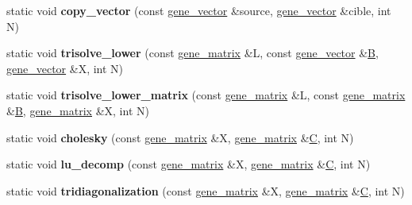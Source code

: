 \begin{DoxyCompactItemize}
static void {\bfseries copy\+\_\+vector} (const \hyperlink{group___core___module_class_eigen_1_1_matrix}{gene\+\_\+vector} \&source, \hyperlink{group___core___module_class_eigen_1_1_matrix}{gene\+\_\+vector} \&cible, int N)
\item 
\mbox{\label{classeigen2__interface_a54fa14604cc4b0b1e3242ade3169b3da}} 
static void {\bfseries trisolve\+\_\+lower} (const \hyperlink{group___core___module_class_eigen_1_1_matrix}{gene\+\_\+matrix} \&L, const \hyperlink{group___core___module_class_eigen_1_1_matrix}{gene\+\_\+vector} \&\hyperlink{group___core___module_class_eigen_1_1_matrix}{B}, \hyperlink{group___core___module_class_eigen_1_1_matrix}{gene\+\_\+vector} \&X, int N)
\item 
\mbox{\label{classeigen2__interface_ac52c06543bc30c0527a7f79c2c2b516e}} 
static void {\bfseries trisolve\+\_\+lower\+\_\+matrix} (const \hyperlink{group___core___module_class_eigen_1_1_matrix}{gene\+\_\+matrix} \&L, const \hyperlink{group___core___module_class_eigen_1_1_matrix}{gene\+\_\+matrix} \&\hyperlink{group___core___module_class_eigen_1_1_matrix}{B}, \hyperlink{group___core___module_class_eigen_1_1_matrix}{gene\+\_\+matrix} \&X, int N)
\item 
\mbox{\label{classeigen2__interface_a7aba0565565f8768bbba2bb596358056}} 
static void {\bfseries cholesky} (const \hyperlink{group___core___module_class_eigen_1_1_matrix}{gene\+\_\+matrix} \&X, \hyperlink{group___core___module_class_eigen_1_1_matrix}{gene\+\_\+matrix} \&\hyperlink{group___core___module}{C}, int N)
\item 
\mbox{\label{classeigen2__interface_a2496a534900ab7c5b1efec982222138e}} 
static void {\bfseries lu\+\_\+decomp} (const \hyperlink{group___core___module_class_eigen_1_1_matrix}{gene\+\_\+matrix} \&X, \hyperlink{group___core___module_class_eigen_1_1_matrix}{gene\+\_\+matrix} \&\hyperlink{group___core___module}{C}, int N)
\item 
\mbox{\label{classeigen2__interface_a4a147008360e79e0dd23c1c1cf735522}} 
static void {\bfseries tridiagonalization} (const \hyperlink{group___core___module_class_eigen_1_1_matrix}{gene\+\_\+matrix} \&X, \hyperlink{group___core___module_class_eigen_1_1_matrix}{gene\+\_\+matrix} \&\hyperlink{group___core___module}{C}, int N)

\end{DoxyCompactItemize}
